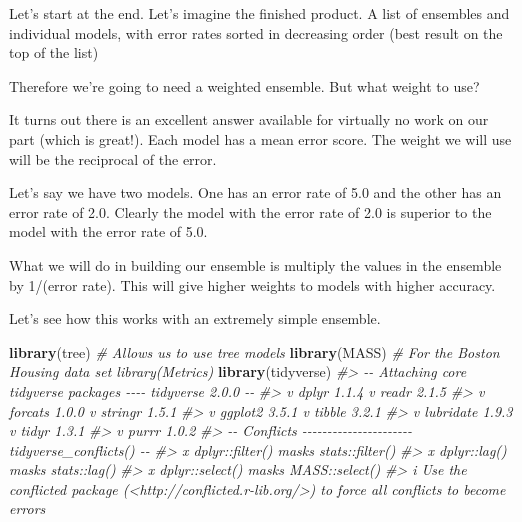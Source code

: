 \documentclass[
]{book}
\newenvironment{Shaded}{\begin{snugshade}}{\end{snugshade}}
\newcommand{\CommentTok}[1]{\textcolor[rgb]{0.56,0.35,0.01}{\textit{#1}}}
\newcommand{\FunctionTok}[1]{\textcolor[rgb]{0.13,0.29,0.53}{\textbf{#1}}}
\newcommand{\NormalTok}[1]{#1}
\begin{document}
Let's start at the end. Let's imagine the finished product. A list of
ensembles and individual models, with error rates sorted in decreasing
order (best result on the top of the list)

Therefore we're going to need a weighted ensemble. But what weight to
use?

It turns out there is an excellent answer available for virtually no
work on our part (which is great!). Each model has a mean error score.
The weight we will use will be the reciprocal of the error.

Let's say we have two models. One has an error rate of 5.0 and the other
has an error rate of 2.0. Clearly the model with the error rate of 2.0
is superior to the model with the error rate of 5.0.

What we will do in building our ensemble is multiply the values in the
ensemble by 1/(error rate). This will give higher weights to models with
higher accuracy.

Let's see how this works with an extremely simple ensemble.

\begin{Shaded}
\begin{Highlighting}[]
\FunctionTok{library}\NormalTok{(tree) }\CommentTok{\# Allows us to use tree models}
\FunctionTok{library}\NormalTok{(MASS) }\CommentTok{\# For the Boston Housing data set library(Metrics)}
\FunctionTok{library}\NormalTok{(tidyverse)}
\CommentTok{\#\textgreater{} {-}{-} Attaching core tidyverse packages {-}{-}{-}{-} tidyverse 2.0.0 {-}{-}}
\CommentTok{\#\textgreater{} v dplyr     1.1.4     v readr     2.1.5}
\CommentTok{\#\textgreater{} v forcats   1.0.0     v stringr   1.5.1}
\CommentTok{\#\textgreater{} v ggplot2   3.5.1     v tibble    3.2.1}
\CommentTok{\#\textgreater{} v lubridate 1.9.3     v tidyr     1.3.1}
\CommentTok{\#\textgreater{} v purrr     1.0.2     }
\CommentTok{\#\textgreater{} {-}{-} Conflicts {-}{-}{-}{-}{-}{-}{-}{-}{-}{-}{-}{-}{-}{-}{-}{-}{-}{-}{-}{-}{-}{-} tidyverse\_conflicts() {-}{-}}
\CommentTok{\#\textgreater{} x dplyr::filter() masks stats::filter()}
\CommentTok{\#\textgreater{} x dplyr::lag()    masks stats::lag()}
\CommentTok{\#\textgreater{} x dplyr::select() masks MASS::select()}
\CommentTok{\#\textgreater{} i Use the conflicted package (\textless{}http://conflicted.r{-}lib.org/\textgreater{}) to force all conflicts to become errors}
\end{Highlighting}
\end{Shaded}
\end{document}
